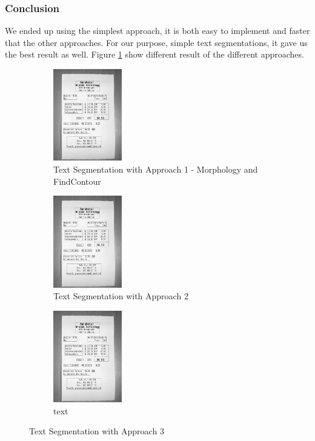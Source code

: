 \documentclass[11pt,a4paper,UKenglish]{article}
\begin{document}
\subsubsection{Conclusion}
We ended up using the simplest approach, it is both easy to implement and faster that the other approaches. For our purpose, simple text segmentations, it gave us the best result as well. Figure \ref{fig:Text_detection_approaches} show different result of the different approaches. 

\begin{figure}
  \centering
  \begin{subfigure}[t]{4cm}
    \includegraphics[width=3cm]{res/segment_text1.png}
    \caption{Text Segmentation with Approach 1 - Morphology and FindContour}
  \end{subfigure}
  \hspace{5mm}%
  \begin{subfigure}[t]{4cm}
    \includegraphics[width=3cm]{res/segment_text1.png}
    \caption{Text Segmentation with Approach 2}
  \end{subfigure}
  \hspace{5mm}%
  \begin{subfigure}[t]{4cm}
    \includegraphics[width=3cm]{res/segment_text1.png}
    \caption{text}
  \end{subfigure}
  \caption{Text Segmentation with Approach 3}
  \label{fig:Text_detection_approaches}
\end{figure}
\end{document}
